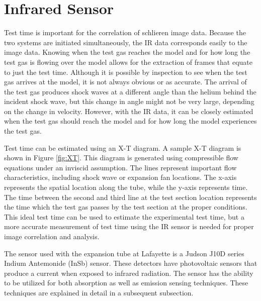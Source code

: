 
\section{Infrared Sensor}

Test time is important for the correlation of schlieren image data. Because the two systems are initiated simultaneously, the IR data corresponds easily to the image data. Knowing when the test gas reaches the model and for how long the test gas is flowing over the model allows for the extraction of frames that equate to just the test time. Although it is possible by inspection to see when the test gas arrives at the model, it is not always obvious or as accurate. The arrival of the test gas produces shock waves at a different angle than the helium behind the incident shock wave, but this change in angle might not be very large, depending on the change in velocity. However, with the IR data, it can be closely estimated when the test gas should reach the model and for how long the model experiences the test gas. 

Test time can be estimated using an X-T diagram. A sample X-T diagram is shown in Figure \ref{fig:XT}. This diagram is generated using compressible flow equations under an inviscid assumption. The lines represent important flow characteristics, including shock wave or expansion fan locations. The x-axis represents the spatial location along the tube, while the y-axis represents time. The time between the second and third line at the test section location represents the time which the test gas passes by the test section at the proper conditions. This ideal test time can be used to estimate the experimental test time, but a more accurate measurement of test time using the IR sensor is needed for proper image correlation and analysis.

The sensor used with the expansion tube at Lafayette is a Judson J10D series Indium Antemonide (InSb) sensor. These detectors have photovoltaic sensors that produce a current when exposed to infrared radiation. The sensor has the ability to be utilized for both absorption as well as emission sensing techniques. These techniques are explained in detail in a subsequent subsection.


